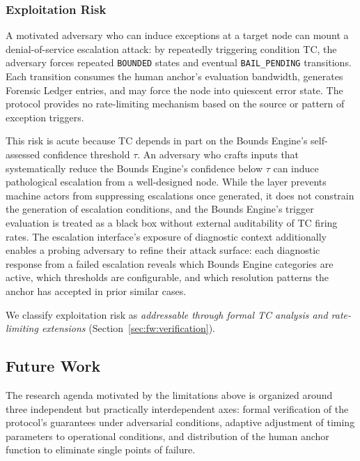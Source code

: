 \subsubsection{Exploitation Risk}
\label{sec:lim:exploitation}

A motivated adversary who can induce exceptions at a target \bxthree{} node can mount a denial-of-service escalation attack: by repeatedly triggering condition TC, the adversary forces repeated \texttt{BOUNDED} states and eventual \texttt{BAIL\_PENDING} transitions. Each transition consumes the human anchor's evaluation bandwidth, generates Forensic Ledger entries, and may force the node into quiescent error state. The protocol provides no rate-limiting mechanism based on the source or pattern of exception triggers.

This risk is acute because TC depends in part on the Bounds Engine's self-assessed confidence threshold $\tau$. An adversary who crafts inputs that systematically reduce the Bounds Engine's confidence below $\tau$ can induce pathological escalation from a well-designed node. While the \fact{} layer prevents machine actors from suppressing escalations once generated, it does not constrain the generation of escalation conditions, and the Bounds Engine's trigger evaluation is treated as a black box without external auditability of TC firing rates. The escalation interface's exposure of diagnostic context additionally enables a probing adversary to refine their attack surface: each diagnostic response from a failed escalation reveals which Bounds Engine categories are active, which thresholds are configurable, and which resolution patterns the anchor has accepted in prior similar cases.

We classify exploitation risk as \emph{addressable through formal TC analysis and rate-limiting extensions} (Section~\ref{sec:fw:verification}).

\subsection{Future Work}\label{sec:future-work}

The research agenda motivated by the limitations above is organized around three independent but practically interdependent axes: formal verification of the protocol's guarantees under adversarial conditions, adaptive adjustment of timing parameters to operational conditions, and distribution of the human anchor function to eliminate single points of failure.

